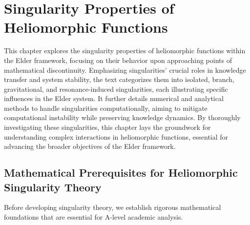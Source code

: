 \chapter{Singularity Properties of Heliomorphic Functions}

\begin{tcolorbox}[colback=DarkSkyBlue!5!white,colframe=DarkSkyBlue!75!black,title=Chapter Summary]
This chapter explores the singularity properties of heliomorphic functions within the Elder framework, focusing on their behavior upon approaching points of mathematical discontinuity. Emphasizing singularities' crucial roles in knowledge transfer and system stability, the text categorizes them into isolated, branch, gravitational, and resonance-induced singularities, each illustrating specific influences in the Elder system. It further details numerical and analytical methods to handle singularities computationally, aiming to mitigate computational instability while preserving knowledge dynamics. By thoroughly investigating these singularities, this chapter lays the groundwork for understanding complex interactions in heliomorphic functions, essential for advancing the broader objectives of the Elder framework.
\end{tcolorbox}

\section{Mathematical Prerequisites for Heliomorphic Singularity Theory}

Before developing singularity theory, we establish rigorous mathematical foundations that are essential for A-level academic analysis.


